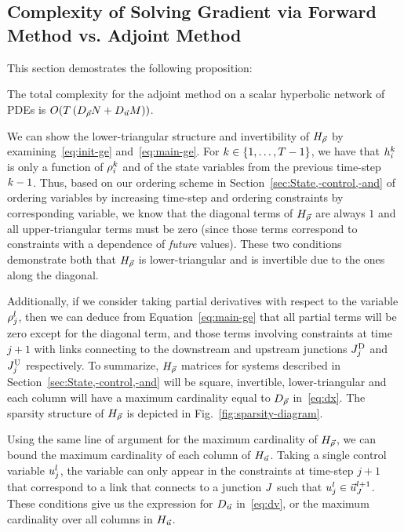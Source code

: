 								
				\subsection{Complexity of Solving Gradient via Forward Method vs. Adjoint Method\label{sub:Complexity-of-solving}}

				This section demostrates the following proposition:

				\begin{prop}
					\textup{The total complexity for the adjoint method on a scalar hyperbolic
						network of PDEs is }$O(T\left(D_{\vec{\rho}}N+D_{\vec{u}}M\right))$.\end{prop}
								
				We can show the lower-triangular structure and invertibility of $H_{\vec{\rho}}$
				by examining~\eqref{eq:init-ge} and~\eqref{eq:main-ge}. For $k\in\left\{ 1,\ldots,T-1\right\}$,
				we have that $h_{i}^{k}$ is only a function of $\rho_{i}^{k}$
				and of the state variables from the previous time-step $k-1$.
				Thus, based on our ordering scheme in Section~\ref{sec:State,-control,-and}
				of ordering variables by increasing time-step and ordering constraints
				by corresponding variable, we know that the diagonal terms of $H_{\vec{\rho}}$ are
				always $1$ and all upper-triangular terms must be zero (since those
				terms correspond to constraints with a dependence of \emph{future}
				values). These two conditions demonstrate both that $H_{\vec{\rho}}$ is lower-triangular
				and is invertible due to the ones along the diagonal.
								
				Additionally, if we consider taking partial derivatives with respect
				to the variable $\rho_{j}^{l}$, then we can deduce from Equation~\eqref{eq:main-ge}
				that all partial terms will be zero except for the diagonal term,
				and those terms involving constraints at time $j+1$ with links connecting
				to the downstream and upstream junctions $J_{j}^{\text{D}}$ and $J_{j}^{\text{U}}$
				respectively. To summarize, $H_{\vec{\rho}}$ matrices for systems described
				in Section~\ref{sec:State,-control,-and} will be square, invertible,
				lower-triangular and each column will have a maximum cardinality equal
				to $D_{\vec{\rho}}$ in~\eqref{eq:dx}. The sparsity structure of
				$H_{\vec{\rho}}$ is depicted in Fig.~\ref{fig:sparsity-diagram}.
								
				Using the same line of argument for the maximum cardinality of $H_{\vec{\rho}}$,
				we can bound the maximum cardinality of each column of $H_{\vec{u}}$. Taking
				a single control variable $u_{j}^{l}$, the variable can only
				appear in the constraints at time-step $j+1$ that correspond to a link
				that connects to a junction $J$ such that $u_{j}^{l}\in\vec{u}_{J}^{l+1}$.
				These conditions give us the expression for $D_{\vec{u}}$ in~\eqref{eq:dv},
				or the maximum cardinality over all columns in $H_{\vec{u}}$.
								
